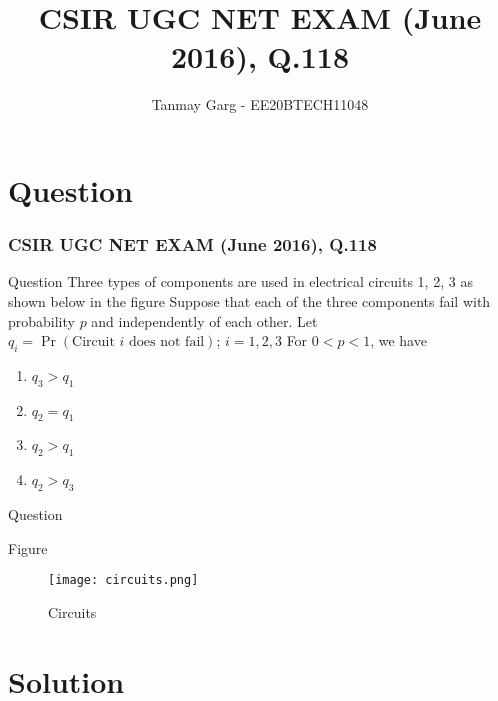 \documentclass{beamer}
\title{CSIR UGC NET EXAM (June 2016), Q.118}
\author{Tanmay Garg - EE20BTECH11048}
\providecommand{\pr}[1]{\ensuremath{\Pr\left(#1\right)}}
\begin{document}
\begin{frame}
\titlepage
\end{frame}
\section{Question}
\begin{frame}
\frametitle{CSIR UGC NET EXAM (June 2016), Q.118}
\begin{block}{Question}
Three types of components are used in electrical circuits 1, 2, 3 as shown below in the figure
Suppose that each of the three components fail with probability $p$ and independently of each other. Let $q_i = \pr{\text{Circuit $i$ does not fail}}$; $i=1,2,3$ For $0<p<1$, we have
    \begin{enumerate}
        \item $q_3>q_1$
        \item $q_2=q_1$
        \item $q_2>q_1$
        \item $q_2>q_3$
    \end{enumerate}
\end{block}
\end{frame}
\begin{frame}{Question}
\begin{block}{Figure}
\begin{figure}[h]
    \centering
    \texttt{[image: circuits.png]}
    \caption{Circuits}
    \label{fig:fig_label}
\end{figure}
\end{block}

\end{frame}

\section{Solution}
\end{document}
